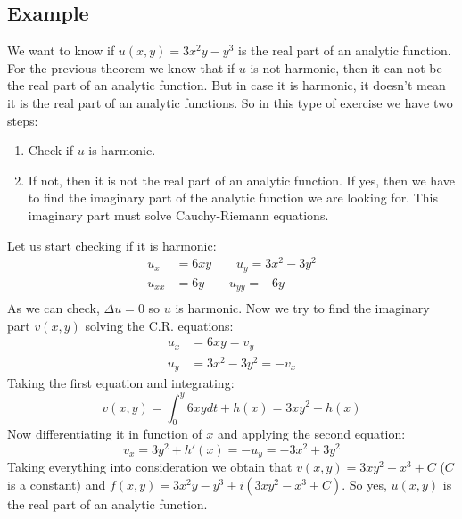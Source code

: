 \documentclass{article}
\begin{document}
    \subsection{Example}
    We want to know if $u(x,y) = 3x^2y-y^3$ is the real part of an analytic function.\\
    For the previous theorem we know that if $u$ is not harmonic, then it can not be the real part of an analytic function. But in case it is harmonic, it doesn't mean it is the real part of an analytic functions. So in this type of exercise we have two steps:
    \begin{enumerate}
        \item Check if $u$ is harmonic.
        \item If not, then it is not the real part of an analytic function. If yes, then we have to find the imaginary part of the analytic function we are looking for. This imaginary part must solve Cauchy-Riemann equations.
    \end{enumerate}
    Let us start checking if it is harmonic:
    \begin{align*}
        u_x &= 6xy \quad \quad u_y = 3x^2-3y^2 \\
        u_{xx} &= 6y \quad \quad u_{yy} = -6y \\
    \end{align*}
    As we can check, $\Delta u = 0 $ so  $u$ is harmonic. Now we try to find the imaginary part $v(x,y)$ solving the C.R. equations:
    \begin{align*}
        u_x &= 6xy = v_y \\
        u_y &= 3x^2-3y^2 = -v_x
    \end{align*}
    Taking the first equation and integrating:\\
    \begin{equation*}
        v(x,y)=\int_{0}^y6xydt+h(x)=3xy^2+h(x)
    \end{equation*}
    Now differentiating it in function of $x$ and applying the second equation:\\
    \begin{equation*}
        v_x= 3y^2 + h'(x) = -u_y = -3x^2+3y^2
    \end{equation*}
    Taking everything into consideration we obtain that $v(x,y) = 3xy^2 - x^3 + C$ ($C$ is a constant) and $f(x,y)= 3x^2y-y^3+i(3xy^2 - x^3 + C)$. So yes, $u(x,y)$ is the real part of an analytic function.
\end{document}
